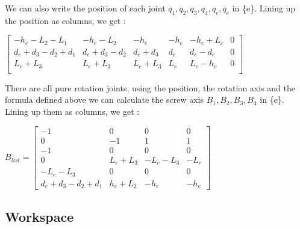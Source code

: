\bigbreak
We can also write the position of each joint  $q_1,q_2,q_3,q_4,q_c,q_e$ in \{e\}. Lining up the position as columns, we get : 

\begin{center}
    $
    \begin{bmatrix}
        -h_e-L_2-L_1 & -h_e-L_2 & -h_e & -h_e & -h_e+L_c & 0  \\
        d_e+d_3-d_2+d_1 & d_e+d_3-d_2 & d_e+d_3 & d_e & d_e-d_c & 0 \\
        L_e+L_3 & L_e+L_3 & L_e+L_3 & L_e & L_e-h_c & 0 \\
    \end{bmatrix}
    $
\end{center}

\bigbreak
There are all pure rotation joints, using the position, the rotation axis and the formula defined above we can calculate the screw axis $B_1,B_2,B_3,B_4$ in \{e\}. Lining up them as columns, we get : 

\begin{center}
    $B_{list} = 
    \begin{bmatrix}
        -1 & 0 & 0 & 0 \\
        0 & -1 & 1 & 1 \\
        -1 & 0 & 0 & 0 \\
        0 & L_e+L_3 & -L_e-L_3 & -L_e \\
        -L_e-L_3 & 0 & 0 & 0 \\
        d_e+d_3-d_2+d_1 & h_e+L_2 & -h_e & -h_e
    \end{bmatrix}
    $
\end{center}

\subsection{Workspace}

